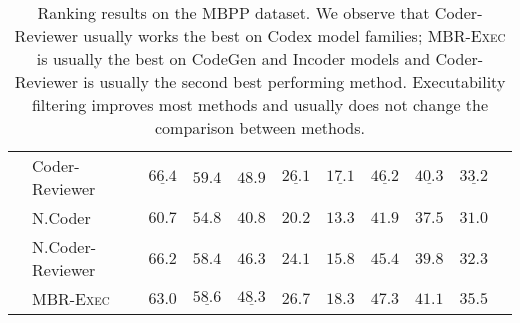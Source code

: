 \documentclass[nohyperref]{article}
\theoremstyle{plain}
\theoremstyle{definition}
\theoremstyle{remark}
\begin{document}
\begin{table*}[]
\begin{tabular}{l|lccccccccc}
    & Coder-Reviewer &  $\underline{66.4}$ &     $\mathbf{59.4}$ &     $\mathbf{48.9}$ &  $\underline{26.1}$ &  $\underline{17.1}$ &  $\underline{46.2}$ &  $\underline{40.3}$ &  $\underline{33.2}$ \\
\cmidrule{2-10}
    & N.Coder &              $60.7$ &              $54.8$ &              $40.8$ &              $20.2$ &              $13.3$ &              $41.9$ &              $37.5$ &              $31.0$ \\
    & N.Coder-Reviewer &              $66.2$ &              $58.4$ &              $46.3$ &              $24.1$ &              $15.8$ &              $45.4$ &              $39.8$ &              $32.3$ \\
\cmidrule{2-10}
    & MBR-\textsc{Exec} &              $63.0$ &  $\underline{58.6}$ &  $\underline{48.3}$ &     $\mathbf{26.7}$ &     $\mathbf{18.3}$ &     $\mathbf{47.3}$ &     $\mathbf{41.1}$ &     $\mathbf{35.5}$ \\
\bottomrule
\end{tabular}
 \caption{
Ranking results on the MBPP dataset. We observe that Coder-Reviewer usually works the best on Codex model families; MBR-\textsc{Exec} is usually the best on CodeGen and Incoder models and Coder-Reviewer is usually the second best performing method. Executability filtering improves most methods and usually does not change the comparison between methods.
}
\label{tab:app_mbpp_exec}
\end{table*}
\end{document}
